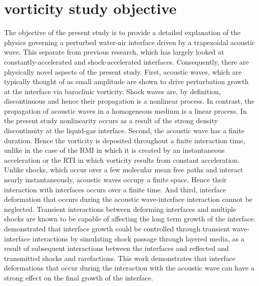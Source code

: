 \section*{vorticity study objective}
The objective of the present study is to provide a detailed
explanation of the physics governing a perturbed water-air interface
driven by a trapezoidal acoustic wave. This separate from previous
research, which has largely looked at constantly-accelerated and
shock-accelerated interfaces. Consequently, there are physically novel
aspects of the present study.  First, acoustic waves, which are
typically thought of as small amplitude are shown to drive
perturbation growth at the interface via baroclinic vorticity. Shock
waves are, by definition, discontinuous and hence their propagation is
a nonlinear process. In contrast, the propagation of acoustic waves in
a homogeneous medium is a linear process. In the present study
nonlinearity occurs as a result of the strong density discontinuity at
the liquid-gas interface. Second, the acoustic wave has a finite
duration. Hence the vorticity is deposited throughout a finite
interaction time, unlike in the case of the \ac{RMI} in which it is
created by an instantaneous acceleration or the \ac{RTI} in which
vorticity results from constant acceleration. Unlike shocks, which
occur over a few molecular mean free paths and interact nearly
instantaneously, acoustic waves occupy a finite space. Hence their
interaction with interfaces occurs over a finite time. And third,
interface deformation that occurs during the acoustic wave-interface
interaction cannot be neglected. Transient interactions between
deforming interfaces and multiple shocks are known to be capable of
affecting the long term growth of the
interface. \cite{HenrydeFrahan2015b} demonstrated that interface
growth could be controlled through transient wave-interface
interactions by simulating shock passage through layered media, as a
result of subsequent interactions between the interfaces and reflected
and transmitted shocks and rarefactions. This work demonstrates that
interface deformations that occur during the interaction with the
acoustic wave can have a strong effect on the final growth of the
interface.

